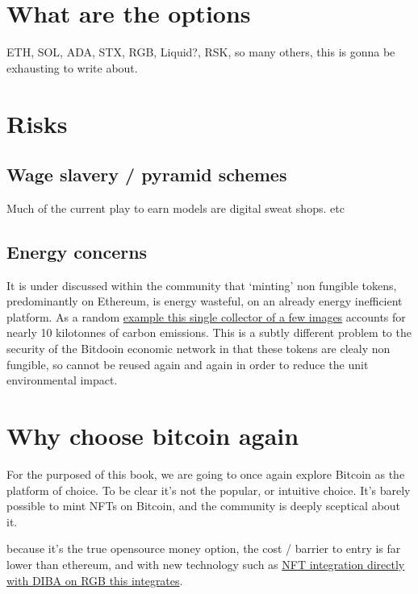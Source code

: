 \section{What are the options }
ETH, SOL, ADA, STX, RGB, Liquid?, RSK, so many others, this is gonna be exhausting to write about.

\lipsum[50]
\section{Risks}
\subsection{Wage slavery / pyramid schemes}
Much of the current play to earn models are digital sweat shops. etc
\subsection{Energy concerns}
It is under discussed within the community that `minting' non fungible tokens, predominantly on Ethereum, is energy wasteful, on an already energy inefficient platform. As a random \href{https://carbon.fyi/?address=0x6Ec30Fd91A504Aad948839B985C7263888B2Ad68} {example this single collector of a few images} accounts for nearly 10 kilotonnes of carbon emissions. This is a subtly different problem to the security of the Bitdooin economic network in that these tokens are clealy non fungible, so cannot be reused again and again in order to reduce the unit environmental impact. 
\section{Why choose bitcoin again }
For the purposed of this book, we are going to once again explore Bitcoin as the platform of choice. To be clear it's not the popular, or intuitive choice. It's barely possible to mint NFTs on Bitcoin, and the community is deeply sceptical about it.\par
because it's the true opensource money option, the cost / barrier to entry is far lower than ethereum, and with new technology such as \href{https://diba.io}{NFT integration directly with DIBA on RGB this integrates}. 
\lipsum[50]